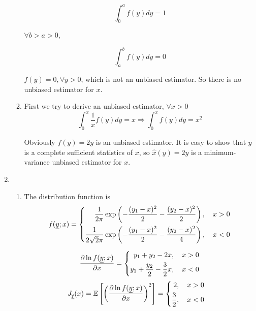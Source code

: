 \documentclass[a4paper]{article}
\begin{document}
\begin{enumerate}
\begin{enumerate}
    \begin{equation}
      \int_{0}^{a} f(y)dy = 1
    \end{equation}

    $\forall b>a>0$,

    \begin{equation}
      \int_{a}^{b} f(y)dy = 0 
    \end{equation}

    $f(y) = 0,\forall y >0$, which is not an unbiased estimator. So there is no unbiased estimator for $x$.

    \item First we try to derive an unbiased estimator, $\forall x>0$
    \begin{equation}
      \int_{0}^{x} \frac{1}{x}f(y)dy = x \Longrightarrow \int_{0}^{x} f(y)dy = x^2
    \end{equation}

    Obviously $f(y) = 2y$ is an unbiased estimator. It is easy to show that $y$ is a complete sufficient statistics of $x$, so $\hat{x} (y) = 2y$ is a minimum-variance unbiased estimator for $x$.

  \end{enumerate}

  \item \begin{enumerate}
    \item The distribution function is 
    \begin{equation}
      f(\underline{y};x) = \left\{\begin{aligned}
        \frac{1}{2\pi}\exp\left({-\frac{(y_1-x)^2}{2}} - \frac{(y_2-x)^2}{2}\right), \quad x>0 \\
        \frac{1}{2\sqrt{2}\pi }\exp\left({-\frac{(y_1-x)^2}{2}} - \frac{(y_2-x)^2}{4}\right), \quad x<0 
      \end{aligned}\right.
    \end{equation}

    \begin{equation}
      \frac{\partial \ln f(\underline{y};x)}{\partial x} = \left\{\begin{aligned}
        y_1+y_2 -2x, \quad x>0 \\
        y_1+\frac{y_2}{2} - \frac{3}{2} x, \quad x<0 
      \end{aligned}\right.
    \end{equation}
    \begin{equation}
      \begin{aligned}
        J_{\underline{\mathsf{y}}}(x) &= \operatorname{\mathbb{E}}\left[\left(\frac{\partial \ln f(\underline{y};x)}{\partial x}\right)^2\right] = \left\{\begin{aligned}
          2, \quad x>0 \\ 
          \frac{3}{2},\quad x<0 
        \end{aligned}\right.
      \end{aligned}
    \end{equation}
  

\end{enumerate}
\end{enumerate}
\end{document}
